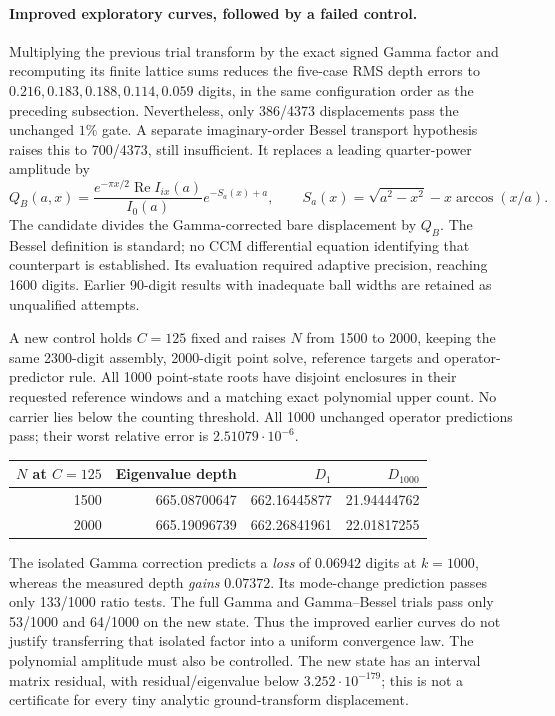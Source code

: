 \paragraph{Improved exploratory curves, followed by a failed control.}
Multiplying the previous trial transform by the exact signed Gamma
factor and recomputing its finite lattice sums reduces the five-case
RMS depth errors to $0.216,0.183,0.188,0.114,0.059$ digits, in the
same configuration order as the preceding subsection. Nevertheless,
only 386/4373 displacements pass the unchanged $1\%$ gate.
A separate imaginary-order Bessel transport hypothesis raises this
to 700/4373, still insufficient. It replaces a leading quarter-power
amplitude by
\[
 Q_B(a,x)=\frac{e^{-\pi x/2}\operatorname{Re}I_{ix}(a)}{I_0(a)}
                  e^{-S_a(x)+a},\qquad
 S_a(x)=\sqrt{a^2-x^2}-x\arccos(x/a).
\]
The candidate divides the Gamma-corrected bare displacement by $Q_B$.
The Bessel definition is standard\cite{DLMFImaginaryBessel}; no CCM
differential equation identifying that counterpart is established. Its evaluation
required adaptive precision, reaching 1600 digits. Earlier 90-digit
results with inadequate ball widths are retained as unqualified attempts.

A new control holds $C=125$ fixed and raises $N$ from 1500 to 2000,
keeping the same 2300-digit assembly, 2000-digit point solve, reference
targets and operator-predictor rule. All 1000 point-state roots have
disjoint enclosures in their requested reference windows and a matching
exact polynomial upper count. No carrier lies below the counting
threshold. All 1000 unchanged operator predictions pass; their worst
relative error is $2.51079\cdot10^{-6}$.
\begin{center}\small
\begin{tabular}{r|rrr}
\toprule
$N$ at $C=125$&Eigenvalue depth&$D_1$&$D_{1000}$\\
\midrule
1500&665.08700647&662.16445877&21.94444762\\
2000&665.19096739&662.26841961&22.01817255\\
\bottomrule
\end{tabular}
\end{center}
The isolated Gamma correction predicts a \emph{loss} of $0.06942$
digits at $k=1000$, whereas the measured depth \emph{gains} $0.07372$.
Its mode-change prediction passes only 133/1000 ratio tests. The full
Gamma and Gamma--Bessel trials pass only 53/1000 and 64/1000 on the new
state. Thus the improved earlier curves do not justify transferring
that isolated factor into a uniform convergence law. The polynomial
amplitude must also be controlled. The new state has an interval matrix
residual, with residual/eigenvalue below $3.252\cdot10^{-179}$; this is
not a certificate for every tiny analytic ground-transform displacement.

